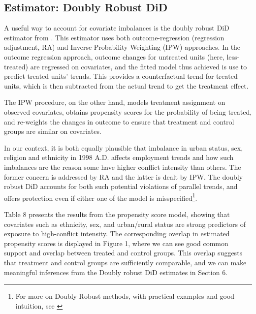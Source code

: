 \documentclass[12pt,a4paper]{article}
\begin{document}
\subsection{Estimator: Doubly Robust DiD}

A useful way to account for covariate imbalances is the doubly robust DiD estimator from \parencite{sant2020doubly}. This estimator uses both outcome-regression (regression adjustment, RA) and Inverse Probability Weighting (IPW) approaches. In the outcome regression approach, outcome changes for untreated units (here, less-treated) are regressed on covariates, and the fitted model thus achieved is use to predict treated units' trends. This provides a counterfactual trend for treated units, which is then subtracted from the actual trend to get the treatment effect. 

The IPW procedure, on the other hand, models treatment assignment on observed covariates, obtains propensity scores for the probability of being treated, and re-weights the changes in outcome to ensure that treatment and control groups are similar on covariates.

In our context, it is both equally plausible that imbalance in urban status, sex, religion and ethnicity in 1998 A.D. affects employment trends and how such imbalances are the reason some have higher conflict intensity than others. The former concern is addressed by RA and the latter is dealt by IPW. The doubly robust DiD accounts for both such potential violations of parallel trends, and offers protection even if either one of the model is misspecified\footnote{For more on Doubly Robust methods, with practical examples and good intuition, see \textcite{baker2025difference}}.


Table 8 presents the results from the propensity score model, showing that covariates such as ethnicity, sex, and urban/rural status are strong predictors of exposure to high-conflict intensity. The corresponding overlap in estimated propensity scores is displayed in Figure 1, where we can see good common support and overlap between treated and control groups. This overlap suggests that treatment and control groups are sufficiently comparable, and we can make meaningful inferences from the Doubly robust DiD estimates in Section 6.


\end{document}
